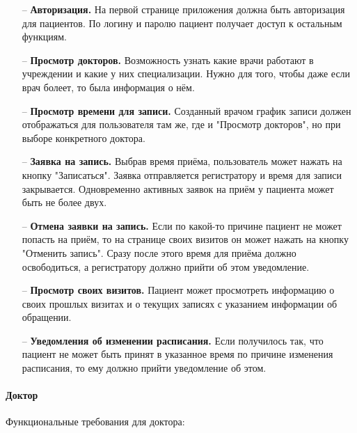 \documentclass[a4paper,article]{article}
\begin{document}
    \begin{itemize}[nolistsep]
        \item[--] \textbf{Авторизация.} На первой странице приложения должна быть авторизация для пациентов. По логину и паролю пациент получает доступ к остальным функциям.
        \item[--] \textbf{Просмотр докторов.} Возможность узнать какие врачи работают в учреждении и какие у них специализации. Нужно для того, чтобы даже если врач болеет, то была информация о нём.
        \item[--] \textbf{Просмотр времени для записи.} Созданный врачом график записи должен отображаться для пользователя там же, где и "Просмотр докторов", но при выборе конкретного доктора.
        \item[--] \textbf{Заявка на запись.} Выбрав время приёма, пользователь может нажать на кнопку "Записаться". Заявка отправляется регистратору и время для записи закрывается. Одновременно активных заявок на приём у пациента может быть не более двух.
        \item[--] \textbf{Отмена заявки на запись.} Если по какой-то причине пациент не может попасть на приём, то на странице своих визитов он может нажать на кнопку "Отменить запись". Сразу после этого время для приёма должно освободиться, а регистратору должно прийти об этом уведомление.
        \item[--] \textbf{Просмотр своих визитов.} Пациент может просмотреть информацию о своих прошлых визитах и о текущих записях с указанием информации об обращении.
        \item[--] \textbf{Уведомления об изменении расписания.} Если получилось так, что пациент не может быть принят в указанное время по причине изменения расписания, то ему должно прийти уведомление об этом.
    \end{itemize}

    \paragraph{Доктор}\label{ТЗ. Доктор}

    Функциональные требования для доктора:
\end{document}
